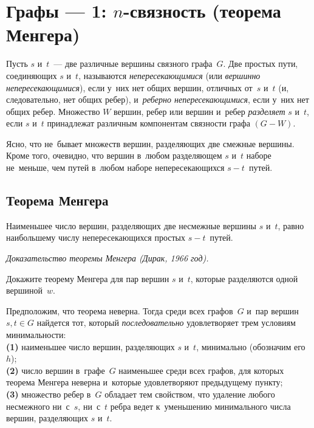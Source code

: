 

\section*{Графы --- 1: $n$-связность (теорема Менгера)}



Пусть $s$ и~$t$~--- две различные вершины связного графа~$G$.
Две простых пути, соединяющих $s$ и~$t$, называются \emph{непересекающимися}
(или \emph{вершинно непересекающимися}), если у~них нет общих вершин, отличных
от~$s$ и~$t$ (и, следовательно, нет общих ребер),
и~\emph{реберно непересекающимися}, если у~них нет общих ребер.
Множество $W$ вершин, ребер или вершин и~ребер \emph{разделяет} $s$ и~$t$, если
$s$ и~$t$ принадлежат различным компонентам связности графа $(G - W)$.

Ясно, что не~бывает множеств вершин, разделяющих две смежные вершины.
Кроме того, очевидно, что вершин в~любом разделяющем $s$ и~$t$ наборе
не~меньше, чем путей в~любом наборе непересекающихся $s {-} t$~путей.

\subsection*{Теорема Менгера}

Наименьшее число вершин, разделяющих две несмежные вершины $s$ и~$t$, равно
наибольшему числу непересекающихся простых $s {-} t$~путей.

\emph{Доказательство теоремы Менгера (Дирак, 1966 год).}

\begin{problems}

\item
Докажите теорему Менгера для пар вершин $s$ и~$t$, которые разделяются одной
вершиной~$w$.

\end{problems}

Предположим, что теорема неверна.
Тогда среди всех графов~$G$ и~пар вершин $s, t \in G$ найдется тот, который
\emph{последовательно} удовлетворяет трем условиям минимальности:
\\
\textbf{(1)}
наименьшее число вершин, разделяющих $s$ и~$t$, минимально
(обозначим его~$h$);
\\
\textbf{(2)}
число вершин в~графе~$G$ наименьшее среди всех графов, для которых
теорема Менгера неверна и~которые удовлетворяют предыдущему пункту;
\\
\textbf{(3)}
множество ребер в~$G$ обладает тем свойством, что удаление любого несмежного
ни~с~$s$, ни~с~$t$ ребра ведет к~уменьшению минимального числа вершин,
разделяющих $s$ и~$t$.

